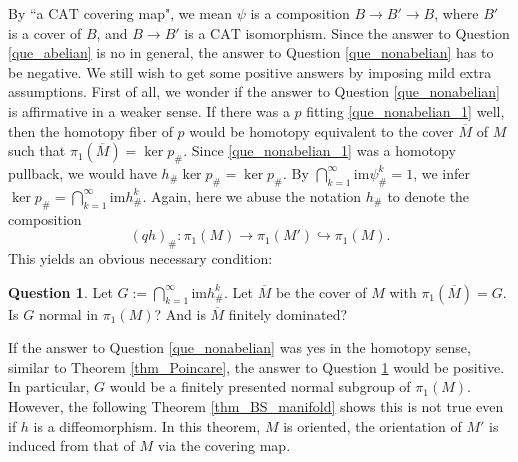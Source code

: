 \documentclass[12pt]{amsart}
\theoremstyle{plain}
\theoremstyle{definition}
\theoremstyle{question}
\newtheorem{question}[theorem]{Question}
\theoremstyle{remark}
\theoremstyle{assumption}
\numberwithin{equation}{section}
\theoremstyle{bigthm}
\begin{document}
By ``a $\mathrm{CAT}$ covering map", we mean $\psi$ is a composition $B \rightarrow B' \rightarrow B$, where $B'$ is a cover of $B$, and $B \rightarrow B'$ is a $\mathrm{CAT}$ isomorphism. Since the answer to Question \ref{que_abelian} is no in general, the answer to Question \ref{que_nonabelian} has to be negative. We still wish to get some positive answers by imposing mild extra assumptions. First of all, we wonder if the answer to Question \ref{que_nonabelian} is affirmative in a weaker sense. If there was a $p$ fitting \eqref{que_nonabelian_1} well, then the homotopy fiber of $p$ would be homotopy equivalent to the cover $\overline{M}$ of $M$ such that $\pi_{1} (\overline{M}) = \ker p_{\#}$. Since \eqref{que_nonabelian_1} was a homotopy pullback, we would have $h_{\#} \ker p_{\#} = \ker p_{\#}$. By $\bigcap_{k=1}^{\infty} \mathrm{im} \psi_{\#}^{k} = 1$, we infer $\ker p_{\#} = \bigcap_{k=1}^{\infty} \mathrm{im} h_{\#}^{k}$. Again, here we abuse the notation $h_{\#}$ to denote the composition
\[
(qh)_{\#} \colon  \pi_{1} (M) \rightarrow \pi_{1} (M') \hookrightarrow \pi_{1} (M).
\]
This yields an obvious necessary condition:

\begin{question}\label{que_cover}
Let $G := \bigcap_{k=1}^{\infty} \mathrm{im} h_{\#}^{k}$. Let $\overline{M}$ be the cover of $M$ with $\pi_{1} (\overline{M}) = G$. Is $G$ normal in $\pi_{1} (M)$? And is $\overline{M}$ finitely dominated?
\end{question}

If the answer to Question \ref{que_nonabelian} was yes in the homotopy sense, similar to Theorem \ref{thm_Poincare}, the answer to Question \ref{que_cover} would be positive. In particular, $G$ would be a finitely presented normal subgroup of $\pi_{1} (M)$. However, the following Theorem \ref{thm_BS_manifold} shows this is not true even if $h$ is a diffeomorphism. In this theorem, $M$ is oriented, the orientation of $M'$ is induced from that of $M$ via the covering map.
\end{document}
